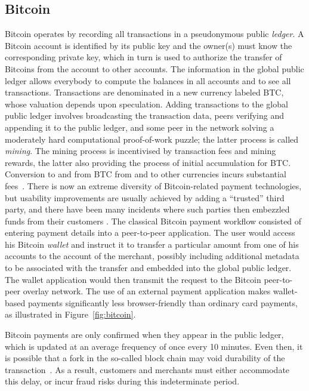 \documentclass{IEEEtran}
\begin{document}
\subsection{Bitcoin}
Bitcoin operates by recording all transactions in a pseu\-do\-ny\-mous
public {\em ledger}.  A Bitcoin account is identified by its public
key and the owner(s) must know the corresponding private key, which in
turn is used to authorize the transfer of Bitcoins from the account to
other accounts.  The information in the global public ledger allows
everybody to compute the balances in all accounts and to see all
transactions.  Transactions are denominated in a new currency labeled
BTC, whose valuation depends upon speculation.  Adding transactions to
the global public ledger involves broadcasting the transaction data,
peers verifying and appending it to the public ledger, and some peer
in the network solving a moderately hard computational proof-of-work
puzzle; the latter process is called {\em mining}.
%
The mining process is incentivised by transaction fees and mining
rewards, the latter also providing the process of initial accumulation
for BTC.~\cite{nakamoto2008bitcoin} Conversion to and from BTC from
and to other currencies incurs substantial fees~\cite{BTCfees}.
There is now an extreme diversity of Bitcoin-related payment
technologies, but usability improvements are usually achieved by
adding a ``trusted'' third party, and there have been many incidents
where such parties then embezzled funds from their customers \cite{BTC:demise}.  The
classical Bitcoin payment workflow consisted of entering payment
details into a peer-to-peer application.  The user would access his
Bitcoin {\em wallet} and instruct it to transfer a particular amount
from one of his accounts to the account of the merchant, possibly
including additional metadata to be associated with the transfer and
embedded into the global public ledger.  The wallet application would
then transmit the request to the Bitcoin peer-to-peer overlay network.
The use of an external payment application makes wallet-based payments
significantly less browser-friendly than ordinary card payments, as
illustrated in Figure~\ref{fig:bitcoin}.

Bitcoin payments are only confirmed when they appear in the public
ledger, which is updated at an average frequency of once every 10
minutes.  Even then, it is possible that a fork in the so-called block
chain may void durability of the
transaction~\cite{nakamoto2008bitcoin}.  As a result, customers and
merchants must either accommodate this delay, or incur fraud risks
during this indeterminate period.
\end{document}
